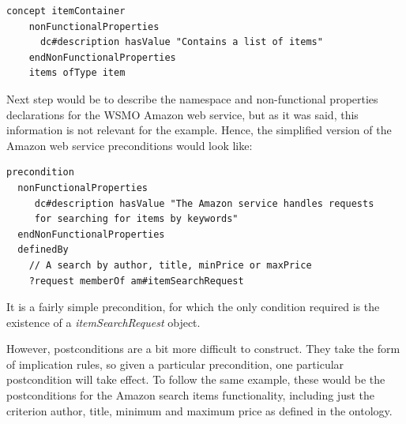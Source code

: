 \documentclass{fast_latex}
\begin{document}
\singlespacing
\begin{small}
\begin{verbatim}
concept itemContainer
    nonFunctionalProperties
      dc#description hasValue "Contains a list of items"
    endNonFunctionalProperties
    items ofType item
\end{verbatim}
\end{small}
\doublespacing

Next step would be to describe the namespace and non-functional properties declarations for the WSMO Amazon web service, but as it was said, this information is not relevant for the example. Hence, the simplified version of the Amazon web service preconditions would look like:

\singlespacing
\begin{small}
\begin{verbatim}
precondition
  nonFunctionalProperties
     dc#description hasValue "The Amazon service handles requests 
     for searching for items by keywords"
  endNonFunctionalProperties
  definedBy
    // A search by author, title, minPrice or maxPrice
    ?request memberOf am#itemSearchRequest
\end{verbatim}
\end{small}
\doublespacing

It is a fairly simple precondition, for which the only condition required is the existence of a \emph{itemSearchRequest} object.

However, postconditions are a bit more difficult to construct. They take the form of implication rules, so given a particular precondition, one particular postcondition will take effect. To follow the same example, these would be the postconditions for the Amazon search items functionality, including just the criterion author, title, minimum and maximum price as defined in the ontology.
\end{document}
